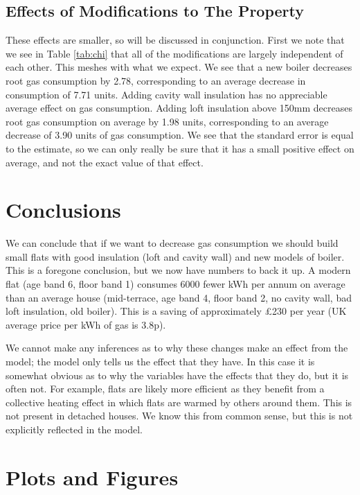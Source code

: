 \documentclass[]{extarticle}
\begin{document}
\subsection{Effects of Modifications to The Property}
These effects are smaller, so will be discussed in conjunction. First we note that we see in Table \ref{tab:chi} that all of the modifications are largely independent of each other. This meshes with what we expect. We see that a new boiler decreases root gas consumption by 2.78, corresponding to an average decrease in consumption of 7.71 units. Adding cavity wall insulation has no appreciable average effect on gas consumption. Adding loft insulation above 150mm decreases root gas consumption on average by 1.98 units, corresponding to an average decrease of 3.90 units of gas consumption. We see that the standard error is equal to the estimate, so we can only really be sure that it has a small positive effect on average, and not the exact value of that effect.

\section{Conclusions}

We can conclude that if we want to decrease gas consumption we should build small flats with good insulation (loft and cavity wall) and new models of boiler. This is a foregone conclusion, but we now have numbers to back it up. A modern flat (age band 6, floor band 1) consumes 6000 fewer kWh per annum on average than an average house (mid-terrace, age band 4, floor band 2, no cavity wall, bad loft insulation, old boiler). This is a saving of approximately \pounds 230 per year (UK average price per kWh of gas is 3.8p). 

We cannot make any inferences as to why these changes make an effect from the model; the model only tells us the effect that they have. In this case it is somewhat obvious as to why the variables have the effects that they do, but it is often not. For example, flats are likely more efficient as they benefit from a collective heating effect in which flats are warmed by others around them. This is not present in detached houses. We know this from common sense, but this is not explicitly reflected in the model. 
%

\appendix

\section{Plots and Figures}
\end{document}
